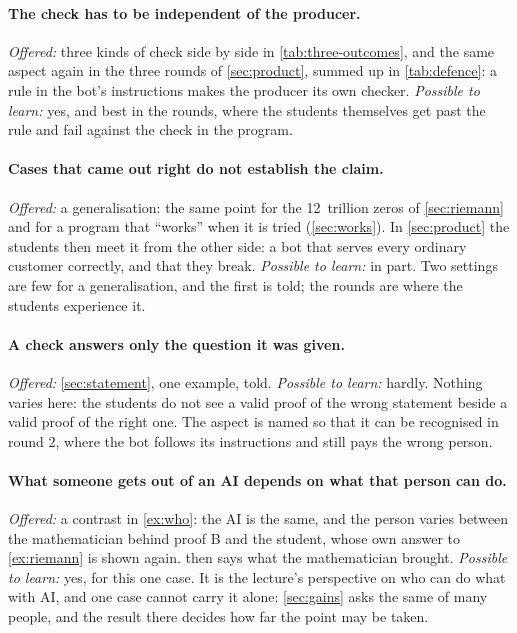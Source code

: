 \paragraph{The check has to be independent of the producer.}
\emph{Offered:} three kinds of check side by side in
\cref{tab:three-outcomes}, and the same aspect again in the three
rounds of \cref{sec:product}, summed up in \cref{tab:defence}: a
rule in the bot's instructions makes the producer its own checker.
\emph{Possible to learn:} yes, and best in the rounds, where the
students themselves get past the rule and fail against the check in
the program.
\paragraph{Cases that came out right do not establish the claim.}
\emph{Offered:} a generalisation: the same point for the 12~trillion
zeros of \cref{sec:riemann} and for a program that \enquote{works}
when it is tried (\cref{sec:works}).
In \cref{sec:product} the students then meet it from the other side: a
bot that serves every ordinary customer correctly, and that they
break.
\emph{Possible to learn:} in part.
Two settings are few for a generalisation, and the first is told; the
rounds are where the students experience it.

\paragraph{A check answers only the question it was given.}
\emph{Offered:} \cref{sec:statement}, one example, told.
\emph{Possible to learn:} hardly.
Nothing varies here: the students do not see a valid proof of the
wrong statement beside a valid proof of the right one.
The aspect is named so that it can be recognised in round 2, where
the bot follows its instructions and still pays the wrong person.
\paragraph{What someone gets out of an AI depends on what that person
  can do.}
\emph{Offered:} a contrast in \cref{ex:who}: the AI is the same, and
the person varies between the mathematician behind proof B and the
student, whose own answer to \cref{ex:riemann} is shown again.
 then says what the mathematician brought.
\emph{Possible to learn:} yes, for this one case.
It is the lecture's perspective on who can do what with AI, and one
case cannot carry it alone: \cref{sec:gains} asks the same of many
people, and the result there decides how far the point may be taken.

